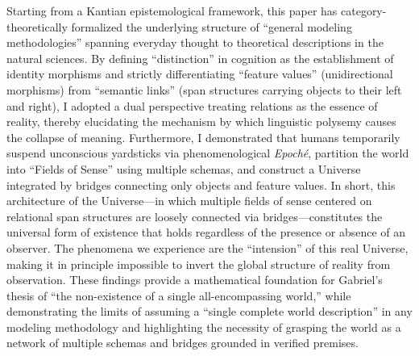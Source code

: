 \documentclass[11pt,a4paper]{article}
\theoremstyle{definition}
\theoremstyle{plain}
\begin{document}
Starting from a Kantian epistemological framework, this paper has category-theoretically formalized the underlying structure of ``general modeling methodologies'' spanning everyday thought to theoretical descriptions in the natural sciences. By defining ``distinction'' in cognition as the establishment of identity morphisms and strictly differentiating ``feature values'' (unidirectional morphisms) from ``semantic links'' (span structures carrying objects to their left and right), I adopted a dual perspective treating relations as the essence of reality, thereby elucidating the mechanism by which linguistic polysemy causes the collapse of meaning. Furthermore, I demonstrated that humans temporarily suspend unconscious yardsticks via phenomenological \textit{Epoch\'e}, partition the world into ``Fields of Sense'' using multiple schemas, and construct a Universe integrated by bridges connecting only objects and feature values. In short, this architecture of the Universe---in which multiple fields of sense centered on relational span structures are loosely connected via bridges---constitutes the universal form of existence that holds regardless of the presence or absence of an observer. The phenomena we experience are the ``intension'' of this real Universe, making it in principle impossible to invert the global structure of reality from observation. These findings provide a mathematical foundation for Gabriel's thesis of ``the non-existence of a single all-encompassing world,'' while demonstrating the limits of assuming a ``single complete world description'' in any modeling methodology and highlighting the necessity of grasping the world as a network of multiple schemas and bridges grounded in verified premises.
\end{document}
